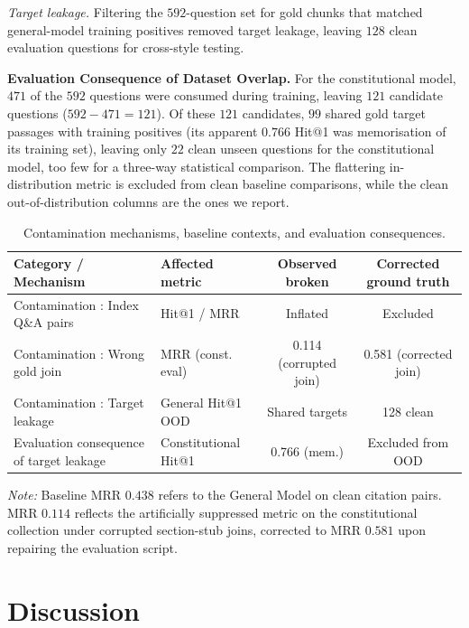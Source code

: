 \documentclass[conference]{IEEEtran}
\begin{document}
\emph{Target leakage.} Filtering the $592$-question set for gold chunks that matched
general-model training positives removed target leakage, leaving $128$ clean evaluation
questions for cross-style testing.

\noindent\textbf{Evaluation Consequence of Dataset Overlap.} For the constitutional model,
$471$ of the $592$ questions were consumed during training, leaving $121$ candidate
questions ($592 - 471 = 121$). Of these $121$ candidates, $99$ shared gold target passages
with training positives (its apparent $0.766$ Hit@1 was memorisation of its training set),
leaving only $22$ clean unseen questions for the constitutional model, too few for a
three-way statistical comparison. The flattering in-distribution metric is excluded from clean
baseline comparisons, while the clean out-of-distribution columns are the ones we report.

\begin{table}[t]
\caption{Contamination mechanisms, baseline contexts, and evaluation consequences.}
\label{tab:leakage}
\centering
\footnotesize
\begin{tabular}{@{}p{}p{}cc@{}}
\toprule
Category / Mechanism & Affected metric & Observed broken & Corrected ground truth \\
\midrule
Contamination \raisebox{.5pt}{\textcircled{\raisebox{-.9pt}1}}: Index Q\&A pairs & Hit@1 / MRR & Inflated & Excluded \\
Contamination \raisebox{.5pt}{\textcircled{\raisebox{-.9pt}2}}: Wrong gold join & MRR (const. eval) & 0.114 (corrupted join) & 0.581 (corrected join) \\
Contamination \raisebox{.5pt}{\textcircled{\raisebox{-.9pt}3}}: Target leakage & General Hit@1 OOD & Shared targets & 128 clean \\
\midrule
Evaluation consequence of target leakage & Constitutional Hit@1 & 0.766 (mem.) & Excluded from OOD \\
\bottomrule
\end{tabular}
\end{table}
\noindent\textit{Note:} Baseline MRR $0.438$ refers to the General Model on clean citation pairs. MRR $0.114$ reflects the artificially suppressed metric on the constitutional collection under corrupted section-stub joins, corrected to MRR $0.581$ upon repairing the evaluation script.

\section{Discussion}
\label{sec:disc}
\end{document}
